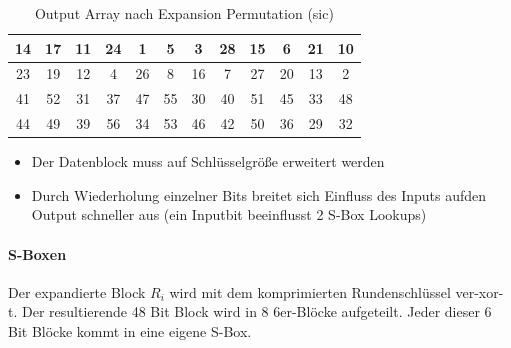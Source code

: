 \begin{table}[h]
    \centering
    \begin{tabular}{|*{12}{c|}}
        \hline
        \cellcolor{orange-1}14 & \cellcolor{yellow-1}17 & \cellcolor{orange-1}11 & \cellcolor{yellow-1}24 & \cellcolor{red-1}1 & 
        \cellcolor{red-1}5 & \cellcolor{red-1}3 & \cellcolor{green-1}28 & \cellcolor{orange-1}15 & \cellcolor{red-1}6 & 
        \cellcolor{yellow-1}21 & \cellcolor{orange-1}10 \\
        \hline 
        \cellcolor{yellow-1}23 & \cellcolor{yellow-1}19 & \cellcolor{orange-1}12 & \cellcolor{red-1}4 & \cellcolor{green-1}26 & 
        \cellcolor{red-1}8 & \cellcolor{orange-1}16 & \cellcolor{red-1}7 & \cellcolor{green-1}27 & \cellcolor{yellow-1}20 & 
        \cellcolor{orange-1}13 & \cellcolor{red-1}2 \\
        \hline 
        \cellcolor{blue-1}41 & \cellcolor{blue-1}52 & \cellcolor{green-1}31 & \cellcolor{blue-1}37 & \cellcolor{blue-1}47 & 
        \cellcolor{blue-1}55 & \cellcolor{green-1}30 & \cellcolor{blue-1}40 & \cellcolor{blue-1}51 & \cellcolor{blue-1}45 & 
        \cellcolor{blue-1}33 & \cellcolor{blue-1}48 \\
        \hline
        \cellcolor{blue-1}44 & \cellcolor{blue-1}49 & \cellcolor{blue-1}39 & \cellcolor{blue-1}56 & \cellcolor{blue-1}34 & 
        \cellcolor{blue-1}53 & \cellcolor{blue-1}46 & \cellcolor{blue-1}42 & \cellcolor{blue-1}50 & \cellcolor{blue-1}36 & 
        \cellcolor{green-1}29 & \cellcolor{green-1}32 \\
        \hline 
    \end{tabular}
    \caption{Output Array nach Expansion Permutation (sic)}
\end{table}

\begin{itemize}
    \item Der Datenblock muss auf Schlüsselgröße erweitert werden
    \item Durch Wiederholung einzelner Bits breitet sich Einfluss des Inputs aufden Output schneller aus (ein Inputbit beeinflusst 2 S-Box Lookups)
\end{itemize}

\paragraph{S-Boxen}

Der expandierte Block $R_i$ wird mit dem komprimierten Rundenschlüssel ver-xor-t. Der resultierende 48 Bit Block wird in 8 6er-Blöcke aufgeteilt. Jeder dieser 6 Bit 
Blöcke kommt in eine eigene S-Box.

